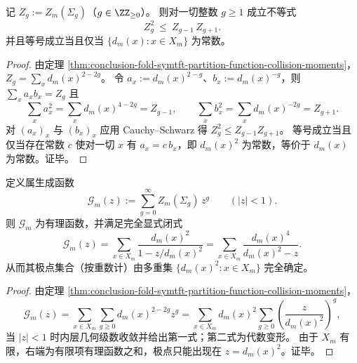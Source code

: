 \begin{proposition}[属配分函数的离散对数凸性]\label{prop:conclusion-tqft-genus-logconvexity}
记 \(Z_g:=Z_m(\Sigma_g)\)（\(g\in\ZZ_{\ge 0}\)）。
则对一切整数 \(g\ge 1\) 成立不等式
\[
Z_g^2\ \le\ Z_{g-1}\,Z_{g+1}.
\]
并且等号成立当且仅当 \(\{d_m(x):x\in X_m\}\) 为常数。
\end{proposition}
\begin{proof}
由定理 \ref{thm:conclusion-fold-symtft-partition-function-collision-moments}，
\(
Z_g=\sum_x d_m(x)^{2-2g}
\)。
令 \(a_x:=d_m(x)^{2-g}\)、\(b_x:=d_m(x)^{-g}\)，则 \(\sum_x a_xb_x=Z_g\) 且
\[
\sum_x a_x^2=\sum_x d_m(x)^{4-2g}=Z_{g-1},\qquad
\sum_x b_x^2=\sum_x d_m(x)^{-2g}=Z_{g+1}.
\]
对 \((a_x)_x\) 与 \((b_x)_x\) 应用 Cauchy--Schwarz 得 \(Z_g^2\le Z_{g-1}Z_{g+1}\)。
等号成立当且仅当存在常数 \(c\) 使对一切 \(x\) 有 \(a_x=c\,b_x\)，即 \(d_m(x)^2\) 为常数，等价于 \(d_m(x)\) 为常数。证毕。
\end{proof}

\begin{proposition}[属生成函数的有理性与极点谱]\label{prop:conclusion-tqft-genus-generating-function-rational}
定义属生成函数
\[
\mathcal{G}_m(z):=\sum_{g=0}^{\infty}Z_m(\Sigma_g)\,z^g\qquad(|z|<1).
\]
则 \(\mathcal{G}_m\) 为有理函数，并满足完全显式闭式
\[
\mathcal{G}_m(z)
=\sum_{x\in X_m}\frac{d_m(x)^2}{1-z/d_m(x)^2}
=\sum_{x\in X_m}\frac{d_m(x)^4}{d_m(x)^2-z}.
\]
从而其极点集合（按重数计）由多重集 \(\{d_m(x)^2:x\in X_m\}\) 完全确定。
\end{proposition}
\begin{proof}
由定理 \ref{thm:conclusion-fold-symtft-partition-function-collision-moments}，
\[
\mathcal{G}_m(z)
=\sum_{x\in X_m}\sum_{g\ge 0} d_m(x)^{2-2g}z^g
=\sum_{x\in X_m}d_m(x)^2\sum_{g\ge 0}\left(\frac{z}{d_m(x)^2}\right)^g,
\]
当 \(|z|<1\) 时内层几何级数收敛并给出第一式；第二式为代数变形。
由于 \(X_m\) 有限，右端为有限项有理函数之和，极点只能出现在 \(z=d_m(x)^2\)。证毕。
\end{proof}

